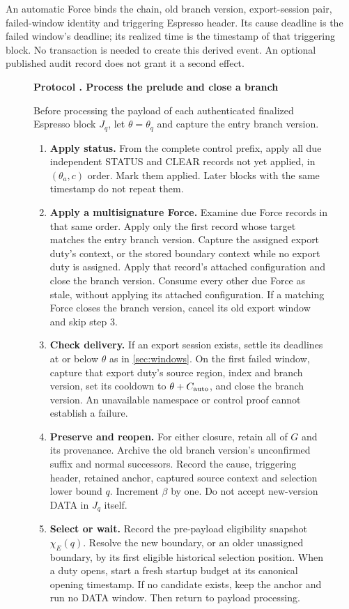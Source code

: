 \documentclass[11pt,a4paper]{article}
\newcounter{protocol}
\newenvironment{protocol}[3][htbp]{\begin{figure}[#1]\refstepcounter{protocol}\label{#2}
\begin{mdframed}[linewidth=.6pt,skipabove=0pt,skipbelow=0pt,
innertopmargin=7pt,innerbottommargin=7pt]\small
\textbf{Protocol \theprotocol. #3}\par\smallskip}{\end{mdframed}\end{figure}}
\begin{document}
An automatic Force binds the chain, old branch version, export-session pair,
failed-window identity and triggering Espresso header. Its cause
deadline is the failed window's deadline; its realized time is the
timestamp of that triggering block. No transaction is needed to create
this derived event. An optional published audit record does not grant
it a second effect.

\begin{protocol}{alg:force}{Process the prelude and close a branch}
Before processing the payload of each authenticated finalized Espresso
block $J_q$, let $\theta=\theta_q$ and capture the entry branch version.
\begin{enumerate}[label=\textbf{\arabic*)},itemsep=3pt]
\item \textbf{Apply status.} From the complete control prefix, apply
all due independent STATUS and CLEAR records not yet applied, in
$(\theta_a,c)$ order. Mark them applied. Later blocks with the same
timestamp do not repeat them.

\item \textbf{Apply a multisignature Force.} Examine due Force
records in that same order. Apply only the first record whose target
matches the entry branch version. Capture the assigned export duty's context,
or the stored boundary context while no export duty is assigned. Apply that record's
attached configuration and close the branch version. Consume every other due
Force as stale, without applying its attached configuration. If a
matching Force closes the branch version, cancel its old export window and
skip step 3.

\item \textbf{Check delivery.} If an export session exists, settle
its deadlines at or below $\theta$ as in \cref{sec:windows}.
On the first failed window, capture that export duty's source region,
index and branch version,
set its cooldown to $\theta+C_{\rm auto}$, and close the branch version.
An unavailable namespace or control proof cannot establish a failure.

\item \textbf{Preserve and reopen.} For either closure, retain all
of $G$ and its provenance. Archive the old branch version's unconfirmed suffix
and normal successors. Record the cause, triggering header, retained
anchor, captured source context and selection lower bound $q$.
Increment $\beta$ by one. Do not accept new-version DATA in $J_q$ itself.

\item \textbf{Select or wait.} Record the pre-payload eligibility
snapshot $\chi_E(q)$. Resolve the new boundary, or an older unassigned
boundary, by its first eligible historical selection position.
When a duty opens, start a fresh startup budget at its canonical
opening timestamp. If no candidate exists, keep the anchor and run
no DATA window. Then return to payload processing.
\end{enumerate}
\end{protocol}
\end{document}
